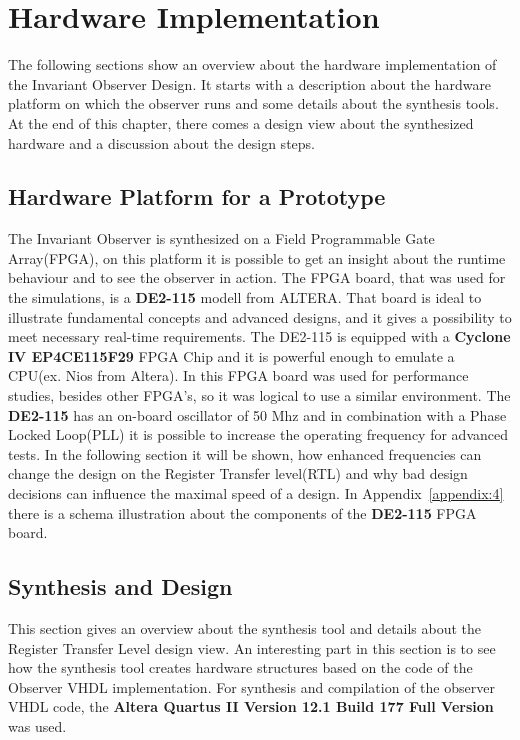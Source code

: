\chapter{Hardware Implementation}
\label{chapter:3}
\ifpdf
    \graphicspath{{Chapter3/Figs/Raster/}{Chapter3/Figs/PDF/}{Chapter3/Figs/}}
\else
    \graphicspath{{Chapter3/Figs/Vector/}{Chapter3/Figs/}}
\fi


The following sections show an overview about the hardware implementation of the Invariant Observer Design. 
It starts with a description about the hardware platform on which the observer runs and some details
about the synthesis tools. 
At the end of this chapter, there comes a design view about the synthesized hardware and a discussion about 
the design steps. 
\section{Hardware Platform for a Prototype}
\label{chapter:3:section:1}
The Invariant Observer is synthesized on a Field Programmable Gate Array(FPGA), on this platform it is possible to get an insight
about the runtime behaviour and to see the observer in action. 
The FPGA board, that was used for the simulations, is a \textbf{DE2-115} modell from ALTERA\cite{altera1}. 
That board is ideal to illustrate fundamental concepts and advanced designs, and it gives a possibility
to meet necessary real-time requirements. The DE2-115 is equipped with a \textbf{Cyclone IV EP4CE115F29} 
FPGA Chip and it is powerful enough to emulate a CPU(ex. Nios from Altera). In \cite{RTFMBJ13} this FPGA board was used for performance studies, besides other FPGA's,
so it was logical to use a similar environment. 
The \textbf{DE2-115} has an on-board oscillator of 50 Mhz and in combination with a Phase Locked Loop(PLL) it is possible to increase the operating frequency for advanced tests. 
In the following section it will be shown, how enhanced frequencies can change the design on the Register Transfer level(RTL) and why bad design decisions 
can influence the maximal speed of a design. In Appendix~\ref{appendix:4} there is a schema illustration about the components of the \textbf{DE2-115} FPGA board. 


\section{Synthesis and Design}
\label{chapter:3:section:2}
This section gives an overview about the synthesis tool and details about the Register Transfer Level design view. 
An interesting part in this section is to see how the synthesis tool creates hardware structures based on the code of the
Observer VHDL implementation. \newline
For synthesis and compilation of the observer VHDL code, the \textbf{Altera Quartus II Version 12.1 Build 177 Full Version} was used. 
